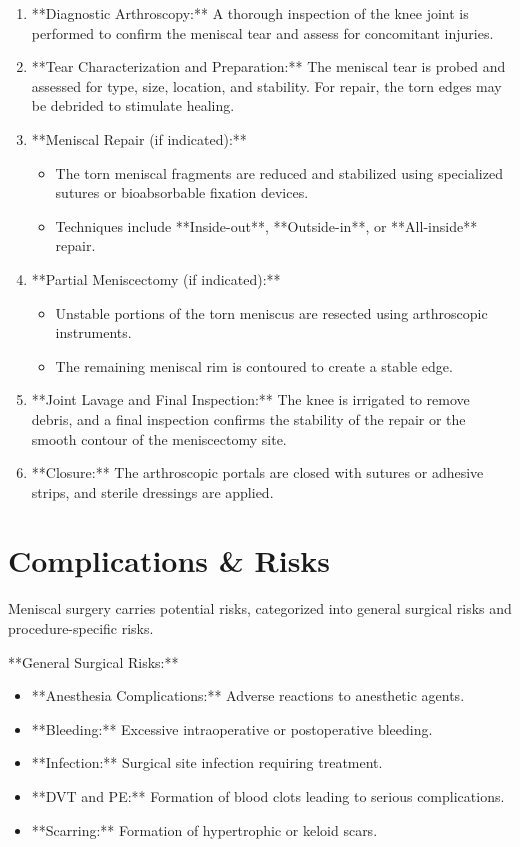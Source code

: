 \begin{enumerate}
  \item **Diagnostic Arthroscopy:** A thorough inspection of the knee joint is performed to confirm the meniscal tear and assess for concomitant injuries.
  
  \item **Tear Characterization and Preparation:** The meniscal tear is probed and assessed for type, size, location, and stability. For repair, the torn edges may be debrided to stimulate healing.

  \item **Meniscal Repair (if indicated):**
      \begin{itemize}
        \item The torn meniscal fragments are reduced and stabilized using specialized sutures or bioabsorbable fixation devices.
        \item Techniques include **Inside-out**, **Outside-in**, or **All-inside** repair.
      \end{itemize}

  \item **Partial Meniscectomy (if indicated):**
      \begin{itemize}
        \item Unstable portions of the torn meniscus are resected using arthroscopic instruments.
        \item The remaining meniscal rim is contoured to create a stable edge.
      \end{itemize}

  \item **Joint Lavage and Final Inspection:** The knee is irrigated to remove debris, and a final inspection confirms the stability of the repair or the smooth contour of the meniscectomy site.

  \item **Closure:** The arthroscopic portals are closed with sutures or adhesive strips, and sterile dressings are applied.
\end{enumerate}

\section*{Complications \& Risks}
Meniscal surgery carries potential risks, categorized into general surgical risks and procedure-specific risks.

**General Surgical Risks:**
\begin{itemize}
  \item **Anesthesia Complications:** Adverse reactions to anesthetic agents.
  \item **Bleeding:** Excessive intraoperative or postoperative bleeding.
  \item **Infection:** Surgical site infection requiring treatment.
  \item **DVT and PE:** Formation of blood clots leading to serious complications.
  \item **Scarring:** Formation of hypertrophic or keloid scars.
\end{itemize}

